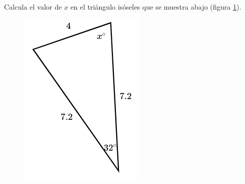 Calcula el valor de $x$ en el triángulo isóseles  que se muestra abajo (figura \ref{fig:findangle13}).

\begin{minipage}[t][][t]{0.35\textwidth}
    \begin{figure}[H]
        \centering
        \includegraphics[width=0.8\linewidth]{../images/findangle13.png}
        \caption{}
        \label{fig:findangle13}
    \end{figure}
\end{minipage}\hfill
